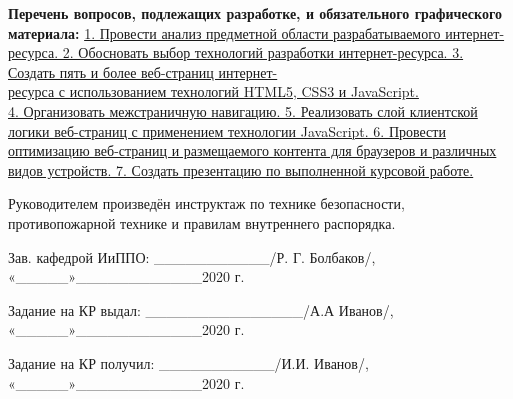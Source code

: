 \documentclass[12pt, a4paper]{extarticle}
\begin{document}
\bigskip

\textbf{Перечень вопросов, подлежащих разработке, и обязательного
графического материала:} \uline{1. Провести анализ предметной
области разрабатываемого интернет-ресурса. 2. Обосновать выбор
технологий разработки интернет-ресурса. 3. Создать пять и более
веб-страниц интернет-\\ресурса с использованием технологий HTML5, CSS3 и
JavaScript.\\
4. Организовать межстраничную навигацию. 5. Реализовать слой клиентской
логики веб-страниц с применением технологии JavaScript. 6. Провести
оптимизацию веб-страниц и размещаемого контента для браузеров и
различных видов устройств. 7. Создать презентацию по выполненной
курсовой работе.}

\bigskip

Руководителем произведён инструктаж по технике безопасности,
противопожарной технике и правилам внутреннего распорядка.

\fontsize{12pt}{1.5}\selectfont

\bigskip

Зав. кафедрой ИиППО: \_\_\_\_\_\_\_\_\_\_\_/Р. Г. Болбаков/,
«\_\_\_\_\_»\_\_\_\_\_\_\_\_\_\_\_\_2020 г.

\medskip

Задание на КР выдал: \_\_\_\_\_\_\_\_\_\_\_\_\_\_\_/А.А Иванов/,
«\_\_\_\_\_»\_\_\_\_\_\_\_\_\_\_\_\_2020 г.

\medskip

Задание на КР получил: \_\_\_\_\_\_\_\_\_\_\_/И.И. Иванов/,
«\_\_\_\_\_»\_\_\_\_\_\_\_\_\_\_\_\_2020 г.
\end{document}

